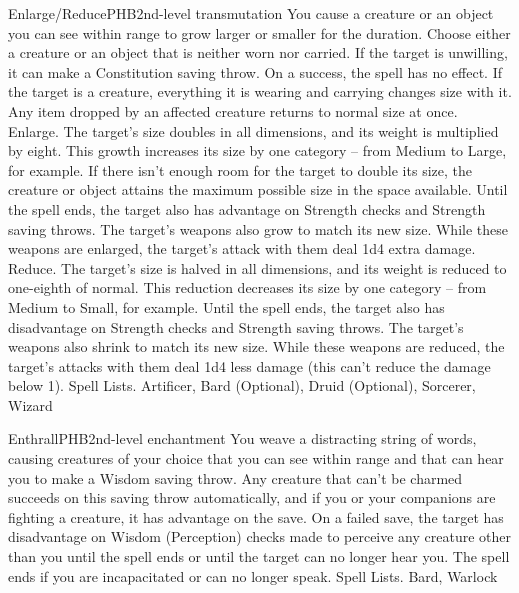 \begin{spell}{Enlarge/Reduce}{PHB}{2nd-level transmutation}
{
}
You cause a creature or an object you can see within range to grow larger or smaller for the duration. Choose either a creature or an object that is neither worn nor carried. If the target is unwilling, it can make a Constitution saving throw. On a success, the spell has no effect.
If the target is a creature, everything it is wearing and carrying changes size with it. Any item dropped by an affected creature returns to normal size at once.
Enlarge. The target’s size doubles in all dimensions, and its weight is multiplied by eight. This growth increases its size by one category – from Medium to Large, for example. If there isn’t enough room for the target to double its size, the creature or object attains the maximum possible size in the space available. Until the spell ends, the target also has advantage on Strength checks and Strength saving throws. The target’s weapons also grow to match its new size. While these weapons are enlarged, the target’s attack with them deal 1d4 extra damage.
Reduce. The target’s size is halved in all dimensions, and its weight is reduced to one-eighth of normal. This reduction decreases its size by one category – from Medium to Small, for example. Until the spell ends, the target also has disadvantage on Strength checks and Strength saving throws. The target’s weapons also shrink to match its new size. While these weapons are reduced, the target’s attacks with them deal 1d4 less damage (this can’t reduce the damage below 1).
Spell Lists. Artificer, Bard (Optional), Druid (Optional), Sorcerer, Wizard
\end{spell}

\begin{spell}{Enthrall}{PHB}{2nd-level enchantment}
{
}
You weave a distracting string of words, causing creatures of your choice that you can see within range and that can hear you to make a Wisdom saving throw. Any creature that can’t be charmed succeeds on this saving throw automatically, and if you or your companions are fighting a creature, it has advantage on the save. On a failed save, the target has disadvantage on Wisdom (Perception) checks made to perceive any creature other than you until the spell ends or until the target can no longer hear you. The spell ends if you are incapacitated or can no longer speak.
Spell Lists. Bard, Warlock
\end{spell}

